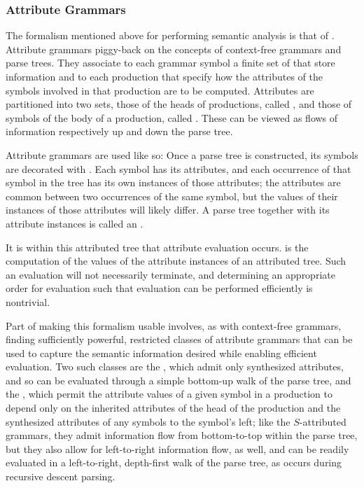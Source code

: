 \subsubsection{Attribute Grammars}
The formalism mentioned above for performing semantic analysis is that of . Attribute grammars piggy-back on the concepts of context-free grammars and parse trees. They associate to each grammar symbol a finite set of  that store information and to each production  that specify how the attributes of the symbols involved in that production are to be computed. Attributes are partitioned into two sets, those of the heads of productions, called , and those of symbols of the body of a production, called . These can be viewed as flows of information respectively up and down the parse tree.

Attribute grammars are used like so: Once a parse tree is constructed, its symbols are decorated with . Each symbol has its attributes, and each occurrence of that symbol in the tree has its own instances of those attributes; the attributes are common between two occurrences of the same symbol, but the values of their instances of those attributes will likely differ. A parse tree together with its attribute instances is called an .


It is within this attributed tree that attribute evaluation occurs.  is the computation of the values of the attribute instances of an attributed tree. Such an evaluation will not necessarily terminate, and determining an appropriate order for evaluation such that evaluation can be performed efficiently is nontrivial.%

Part of making this formalism usable involves, as with context-free grammars, finding sufficiently powerful, restricted classes of attribute grammars that can be used to capture the semantic information desired while enabling efficient evaluation. Two such classes are the , which admit only synthesized attributes, and so can be evaluated through a simple bottom-up walk of the parse tree, and the , which permit the attribute values of a given symbol in a production to depend only on the inherited attributes of the head of the production and the synthesized attributes of any symbols to the symbol's left; like the $S$-attributed grammars, they admit information flow from bottom-to-top within the parse tree, but they also allow for left-to-right information flow, as well, and can be readily evaluated in a left-to-right, depth-first walk of the parse tree, as occurs during recursive descent parsing.

